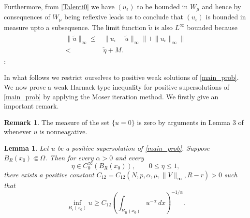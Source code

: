\documentclass[12pt]{extarticle}
\newtheorem{lemma}[theorem]{Lemma}
\theoremstyle{definition}
\theoremstyle{remark}
\theoremstyle{definition}
\newtheorem{remark}[theorem]{Remark}
\numberwithin{equation}{section}
\numberwithin{equation}{section}
\begin{document}
			Furthermore, from \eqref{Talenti0} we have $(u_{\epsilon})$ to be bounded in $W_{\mu}$ and hence by consequences of $W_{\mu}$ being reflexive leads us to conclude that $(u_{\epsilon})$ is bounded in measure upto a subsequence. The limit function $\tilde{u}$ is also $L^{\infty}$ bounded because
			\begin{align}\label{bdd0}
				\begin{split}
					\|\tilde{u}\|_{\infty}\leq&\|u_{\epsilon}-\tilde{u}\|_{\infty}\|+\|u_{\epsilon}\|_{\infty}\|\\
					<&\tilde{\eta}+M.
					\end{split}
					\end{align}
			:~
			
	In what follows we restrict ourselves to positive weak solutions of \eqref{main_prob}. We now prove a weak Harnack type inequality for positive supersolutions of \eqref{main_prob} by applying the Moser iteration method. We firstly give an important remark.
	\begin{remark}\label{meas_0}
		The measure of the set $\{u=0\}$ is zero by arguments in Lemma $3$ of \cite{GS_FCAA} whenever $u$ is nonneagative.
	\end{remark}
			
			\begin{lemma}\label{lem3.1}
				Let $u$ be a positive supersolution of \eqref{main_prob}. Suppose $B_R(x_0)\Subset\Omega$. Then for every $\alpha>0$ and every
				\[
				\eta\in C_0^\infty(B_R(x_0)),
				\qquad
				0\le\eta\le1,
				\]
				there exists a positive constant $C_{12}=C_{12}(N,p,\alpha,\mu,\|V\|_\infty,R-r)>0$
				such that
				\begin{equation}\label{eq3.2}
					\inf_{B_r(x_0)}u
					\ge
					C_{12}
					\left(
					\int_{B_R(x_0)}
					u^{-\alpha}\,dx
					\right)^{-1/\alpha}.
				\end{equation}
			\end{lemma}
			
\end{document}
